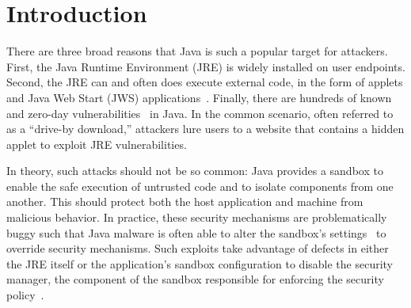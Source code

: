 \documentclass{sig-alternate}
\begin{document}
\section{Introduction}

There are three broad reasons that Java is such a popular target for attackers.
First, the Java Runtime Environment (JRE) is widely installed on user endpoints.
Second, the JRE can and often does execute external code, in the form of
applets and Java Web Start (JWS) %
applications~\cite{gong1997going,gong2003inside}. Finally, there are hundreds
of known and zero-day vulnerabilities~\cite{xforceQ12013} %
in Java. In the
common scenario, often referred to as a ``drive-by download,'' attackers lure
users to a website that contains a hidden applet to exploit JRE vulnerabilities.


In theory, such attacks should not be so common:
Java provides a sandbox to enable the safe execution of untrusted code and to isolate
components from one another. This should protect both the host application and machine from
malicious behavior.
In practice, these security mechanisms are problematically
buggy such that Java malware is often able to alter the sandbox's
settings~\cite{garber_2012} to override security mechanisms. Such exploits take advantage of defects in either
the JRE itself or the application's sandbox configuration to
disable the security manager, the component of the sandbox responsible for enforcing the
security policy~\cite{fireeye_2013,svoboda_anatomy_blog_2013,security_explorations_2012,blackhat_2012}.
\end{document}
